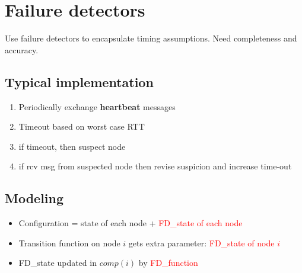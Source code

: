 \section{Failure detectors}

Use failure detectors to encapsulate timing assumptions.
Need completeness and accuracy.

\subsection{Typical implementation}
\begin{enumerate}
    \item Periodically exchange \textbf{heartbeat} messages
    \item Timeout based on worst case RTT
    \item if timeout, then suspect node
    \item if rcv msg from suspected node then revise suspicion and
        increase time-out
\end{enumerate}

\subsection{Modeling}

\begin{itemize}
    \item Configuration = state of each node + \textcolor{red}{FD\_state of each
        node}
    \item Transition function on node $i$ gets extra parameter:
        \textcolor{red}{FD\_state of node $i$}
    \item FD\_state updated in $comp(i)$ by \textcolor{red}{FD\_function}
\end{itemize}

